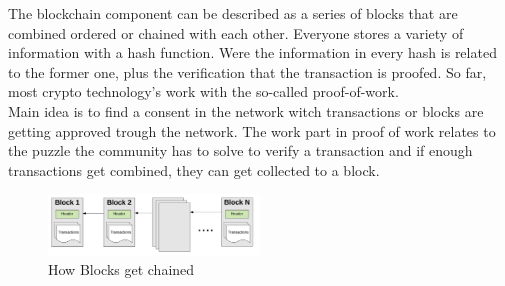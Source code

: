 The blockchain component can be described as a series of blocks that are combined ordered or chained with each other. Everyone stores a variety of information with a hash function. Were the information in every hash is related to the former one, plus the verification that the transaction is proofed. So far, most crypto technology’s work with the so-called proof-of-work. \cite{Ray2018}
\\
Main idea is to find a consent in the network witch transactions or blocks are getting approved trough the network. The work part in proof of work relates to the puzzle the community has to solve to verify a transaction and if enough transactions get combined, they can get collected to a block.

\begin{figure}[ht]
\caption{How Blocks get chained} 
\includegraphics[width=0.5\textwidth]{blockchain}
\end{figure}

